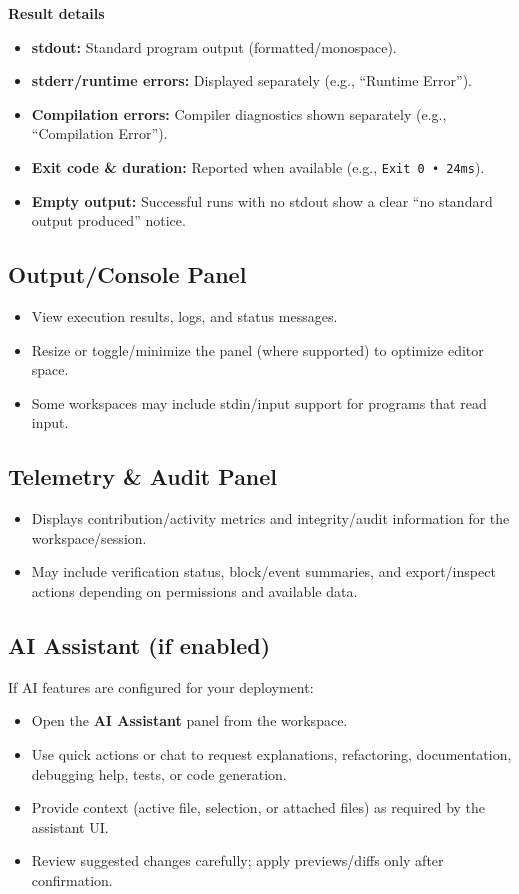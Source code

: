 \documentclass[11pt,a4paper]{article}
\begin{document}
\textbf{Result details}
\begin{itemize}
  \item \textbf{stdout:} Standard program output (formatted/monospace).
  \item \textbf{stderr/runtime errors:} Displayed separately (e.g., ``Runtime Error'').
  \item \textbf{Compilation errors:} Compiler diagnostics shown separately (e.g., ``Compilation Error'').
  \item \textbf{Exit code \& duration:} Reported when available (e.g., \texttt{Exit 0 • 24ms}).
  \item \textbf{Empty output:} Successful runs with no stdout show a clear ``no standard output produced'' notice.
\end{itemize}

\subsection{Output/Console Panel}
\begin{itemize}
  \item View execution results, logs, and status messages.
  \item Resize or toggle/minimize the panel (where supported) to optimize editor space.
  \item Some workspaces may include stdin/input support for programs that read input.
\end{itemize}

\subsection{Telemetry \& Audit Panel}
\begin{itemize}
  \item Displays contribution/activity metrics and integrity/audit information for the workspace/session.
  \item May include verification status, block/event summaries, and export/inspect actions depending on permissions and available data.
\end{itemize}

\subsection{AI Assistant (if enabled)}
If AI features are configured for your deployment:
\begin{itemize}
  \item Open the \textbf{AI Assistant} panel from the workspace.
  \item Use quick actions or chat to request explanations, refactoring, documentation, debugging help, tests, or code generation.
  \item Provide context (active file, selection, or attached files) as required by the assistant UI.
  \item Review suggested changes carefully; apply previews/diffs only after confirmation.
\end{itemize}
\end{document}
